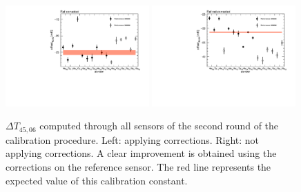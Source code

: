 \begin{figure}[htbp]
\centering
{\includegraphics[width=0.49\textwidth]{images/figure_15_a.pdf}}
{\includegraphics[width=0.49\textwidth]{images/figure_15_b.pdf}}
\caption{$\Delta T_{45,06}$ computed through all sensors of the second round of the calibration procedure. Left: applying corrections. Right: not applying corrections. A clear improvement is obtained using the corrections on the reference sensor. The red line represents the expected value of this calibration constant.}
\label{fig:crosscheck}
\end{figure}